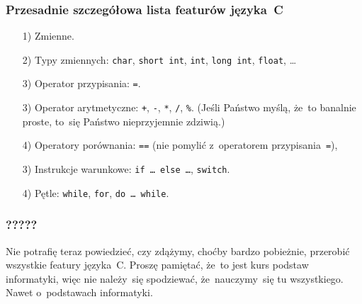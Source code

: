 \documentclass[10pt,t]{beamer}
\begin{document}
\begin{frame}
  \frametitle{Przesadnie szczegółowa lista featurów języka~C}


  \begin{itemize}

  \item[1)] Zmienne.



  \item[2)] Typy zmiennych: \texttt{char}, \texttt{short int}, \texttt{int},
    \texttt{long int}, \texttt{float}, \ldots


  \item[3)] Operator przypisania: \texttt{=}.


  \item[3)] Operator arytmetyczne: \texttt{+}, \texttt{-}, \texttt{*},
    \texttt{/}, \texttt{\%}.
    (Jeśli Państwo myślą, że~to banalnie proste, to~się Państwo
    nieprzyjemnie zdziwią.)



  \item[4)] Operatory porównania: \texttt{==} (nie pomylić z~operatorem
    przypisania~\texttt{=}),



  \item[3)] Instrukcje warunkowe: \texttt{if \ldots{} else \ldots}, \texttt{switch}.



  \item[4)] Pętle: \texttt{while}, \texttt{for}, \texttt{do \ldots{} while}.

  \end{itemize}

\end{frame}





\begin{frame}
  \frametitle{?????}


  Nie potrafię teraz powiedzieć, czy zdążymy, choćby bardzo pobieżnie,
  przerobić \alert{wszystkie} featury języka~C. Proszę pamiętać, że~to jest
  kurs \alert{podstaw informatyki}, więc nie należy~się spodziewać,
  że~nauczymy~się tu wszystkiego. Nawet o~podstawach informatyki.

\end{frame}
\end{document}
